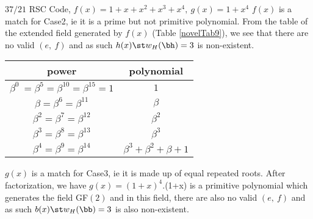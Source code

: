 \newpage

 
 \begin{example}
$37/21$ RSC Code, $f(x)=1+x+x^2+x^3+x^4,~g(x)=1+x^4$\newline
$f(x)$ is a match for Case2, ie it is a prime but not primitive polynomial. From the table of the extended field generated by $f(x)$ (Table \ref{novelTab9}), we see that there are no valid $(e,~f)$ and as such $h(x) \st w_H(\bh)=3$ is non-existent.


 \begin{table*}[h]
 \caption{Non-zero Elements of GF$(2^2)$ generated by $f(x)=1+x+x^2+x^3+x^4$}
\centering
 \begin{tabular}{c c} 
 \hline
 power & polynomial \\ [0.5ex] 
 \hline\hline
$\beta^0~=\beta^5=\beta^{10}=\beta^{15}=1$ & $1$\\
\hline
$\beta=\beta^6=\beta^{11}$ & $\beta$\\
\hline
$\beta^2=\beta^7=\beta^{12}$ &  $\beta^2$\\
\hline
$\beta^3=\beta^8=\beta^{13}$ &  $\beta^3$\\
\hline
$\beta^4=\beta^9=\beta^{14}$ &  $\beta^3+\beta^2+\beta+1$\\
 \end{tabular}
 \label{novelTab9}
\end{table*}

$g(x)$ is a match for Case3, ie it is made up of equal repeated roots. After factorization, we have $g(x)=(1+x)^4. $(1+x) is a primitive polynomial which generates the field GF$(2)$ and in this field, there are also no valid $(e,~f)$ and as such $b(x) \st w_H(\bb)=3$ is also non-existent.
\end{example}
 
